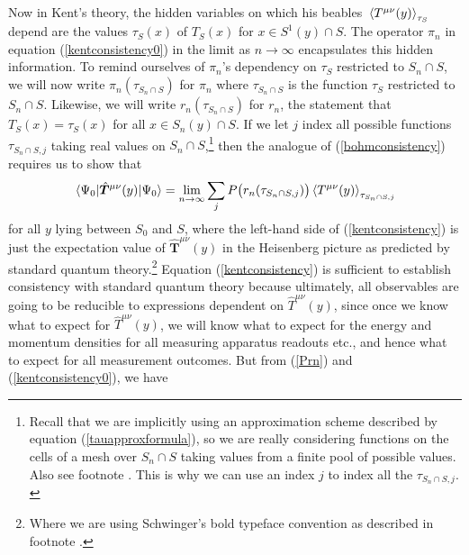 Now in Kent's theory, the hidden variables on which his beables $\ev*{T^{\mu\nu}(y)}_{\tau_S}$ depend are the values $\tau_S(x)$ of $T_S(x)$ for $x\in S^1(y)\cap S$. The operator $\pi_n$ in equation (\ref{kentconsistency0}) in the limit as $n\rightarrow\infty$ encapsulates this hidden information. To remind ourselves of $\pi_n$'s dependency on $\tau_S$ restricted to $S_n\cap S$, we will now write $\pi_n(\tau_{S_n\cap S})$ for %
%
 $\pi_n$ where $\tau_{S_n\cap S}$ is %
%
the function $\tau_S$ restricted to $S_n\cap S$. Likewise, we will write  $r_n(\tau_{S_n\cap S})$ for  %
%
$r_n$, the statement that $T_S(x)=\tau_S(x)$ for all $x\in S_n(y)\cap S$. If we let $j$ index all possible functions $\tau_{S_n\cap S, j}$ taking real values on $S_n\cap S$,\footnote{Recall that we are implicitly using an approximation scheme described by equation (\ref{tauapproxformula}), so we are really considering functions on the cells of a mesh over $S_n\cap S $ taking values from a finite pool of possible values. Also see footnote . This is why we can use an index $j$ to index all the $\tau_{S_n\cap S, j}.$} then the analogue of (\ref{bohmconsistency}) requires us to show that 
\begin{equation}\label{kentconsistency}
\ev*{\hat{\bm{T}}^{\mu\nu}(y)}{\Psi_0}=\lim_{n\rightarrow\infty}\sum_{j}P\big(r_n(\tau_{S_n\cap S, j})\big)\ev*{T^{\mu\nu}(y)}_{\tau_{S_n\cap S, j}}
\end{equation}
for all $y$ lying between $S_0$ and $S$, where the left-hand side of (\ref{kentconsistency}) is just the expectation value of $\hat{\bm{T}}^{\mu\nu}(y)$ in the Heisenberg picture as predicted by standard quantum theory.\footnote{Where we are using Schwinger's bold typeface convention as described in footnote .} Equation (\ref{kentconsistency}) is sufficient to establish consistency with standard quantum theory because ultimately, all observables are going to be reducible to expressions dependent on $\hat{T}^{\mu\nu}(y)$, since once we know what to expect for $\hat{T}^{\mu\nu}(y)$, we will know what to expect for the energy and momentum densities for all measuring apparatus readouts etc., and hence what to expect for all measurement outcomes. But from (\ref{Prn}) and (\ref{kentconsistency0}), we have 
